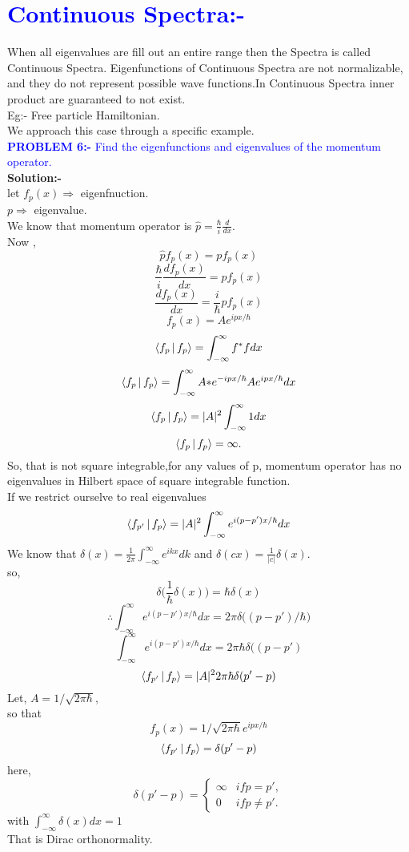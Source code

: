   \section{\textcolor{blue}{Continuous Spectra:-}}
  \hspace*{5cm} When all eigenvalues are fill out an entire range then the Spectra is called Continuous Spectra. Eigenfunctions of Continuous Spectra are not normalizable, and they do not represent possible wave functions.In Continuous Spectra inner product are guaranteed to not exist.\\
  Eg:- Free particle Hamiltonian.\\
  We approach this case through a specific example.\\
 \textcolor{blue}{ \textbf{PROBLEM 6:-} Find the eigenfunctions and eigenvalues of the momentum operator.}\\
  \textbf{Solution:-}\\
  \hspace*{3cm} let $f_{p}(x)\Rightarrow$ eigenfnuction.\\
  $p \Rightarrow$ eigenvalue.\\
  We know that  momentum operator is $\hat{p}=\frac{\hbar}{i}\frac{d}{dx}.$\\
  Now ,\\
  $$\hat{p}f_{p}(x)={p}f_{p}(x)$$
   $$\frac{\hbar}{i}\frac{d{f_{p}(x)}}{dx}={p}f_{p}(x)$$
   $$\frac{d{f_{p}(x)}}{dx}=\frac{i}{\hbar}{p}f_{p}(x)$$
   $$f_{p}(x)= Ae^{{ipx}/{\hbar}}$$
   $$\Braket{f_{p}|f_{p}}=\int_{-\infty}^{\infty}f^{*}f{dx} $$
 $$\Braket{f_{p}|f_{p}}=\int_{-\infty}^{\infty}A{*}e^{-ipx/\hbar}Ae^{ipx/\hbar}{dx} $$
 $$\Braket{f_{p}|f_{p}}=|A|^{2}\int_{-\infty}^{\infty}{1}dx$$
 $$\Braket{f_{p}|f_{p}}=\infty.$$
 So, that is not square integrable,for any values of p, momentum operator has no eigenvalues in Hilbert space of square integrable function.\\
 If we restrict ourselve to real eigenvalues\\
  $$\Braket{f_{p'}|f_{p}}=|A|^{2}\int_{-\infty}^{\infty}{e^{i(p-p')x/\hbar}}{dx} $$
  We know that  $\delta(x)=\frac{1}{2\pi}\int_{-\infty}^{\infty}{e^{ikx}}dk$ and $\delta{(cx)}=\frac{1}{|c|}\delta{(x)}$.\\
  so, $$\delta\Big(\frac{1}{\hbar}\delta{(x)}\Big)=\hbar\delta{(x)}$$
   $$\therefore \int_{-\infty}^{\infty}{e^{i(p-p')x/\hbar}}{dx}=2\pi\delta\Big((p-p')/\hbar\Big) $$
    $$ \int_{-\infty}^{\infty}{e^{i(p-p')x/\hbar}}{dx}=2\pi\hbar\delta((p-p') $$
  $$\Braket{f_{p'}|f_{p}}=|A|^{2}2{\pi}\hbar\delta(p'-p)$$
  Let, $A=1/\sqrt{2\pi\hbar},$\\so that\\
  $$f_{p}(x)=1/\sqrt{2\pi\hbar}e^{{ipx}/{\hbar}}$$
  $$\Braket{f_{p'}|f_{p}}=\delta(p'-p)$$
  here,\\
  $$\delta(p'-p)=\begin{cases}
  \infty  &{if p=p',}\\
  0  &{if p\neq p'.}
  \end{cases}$$
  with $\int_{-\infty}^{\infty}\delta{(x)}dx=1$\\
  That is Dirac orthonormality.\\